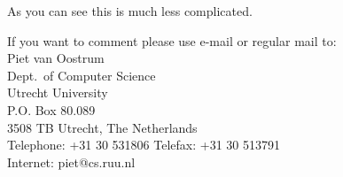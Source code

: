 \documentclass[a4paper]{article}
\begin{document}
As you can see this is much less complicated.

If you want to comment please use e-mail or regular mail to:\\
Piet van Oostrum\\
Dept.\ of Computer Science\\
Utrecht University\\
P.O. Box 80.089\\
3508 TB Utrecht, The Netherlands\\
Telephone: +31 30 531806 Telefax: +31 30 513791\\
Internet: piet@cs.ruu.nl 

\printindex
\end{document}
